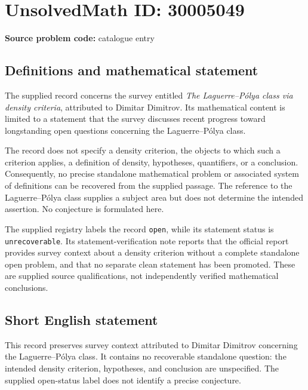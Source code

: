 \documentclass[11pt]{article}
\begin{document}
\section*{UnsolvedMath ID: 30005049}
\textbf{Source problem code:} catalogue entry
\subsection{Definitions and mathematical statement}
The supplied record concerns the survey entitled \emph{The Laguerre--P\'olya class via density criteria}, attributed to Dimitar Dimitrov. Its mathematical content is limited to a statement that the survey discusses recent progress toward longstanding open questions concerning the Laguerre--P\'olya class.

The record does not specify a density criterion, the objects to which such a criterion applies, a definition of density, hypotheses, quantifiers, or a conclusion. Consequently, no precise standalone mathematical problem or associated system of definitions can be recovered from the supplied passage. The reference to the Laguerre--P\'olya class supplies a subject area but does not determine the intended assertion. No conjecture is formulated here.

The supplied registry labels the record \texttt{open}, while its statement status is \texttt{unrecoverable}. Its statement-verification note reports that the official report provides survey context about a density criterion without a complete standalone open problem, and that no separate clean statement has been promoted. These are supplied source qualifications, not independently verified mathematical conclusions.
\subsection{Short English statement}
This record preserves survey context attributed to Dimitar Dimitrov concerning the Laguerre--P\'olya class. It contains no recoverable standalone question: the intended density criterion, hypotheses, and conclusion are unspecified. The supplied open-status label does not identify a precise conjecture.
\end{document}
